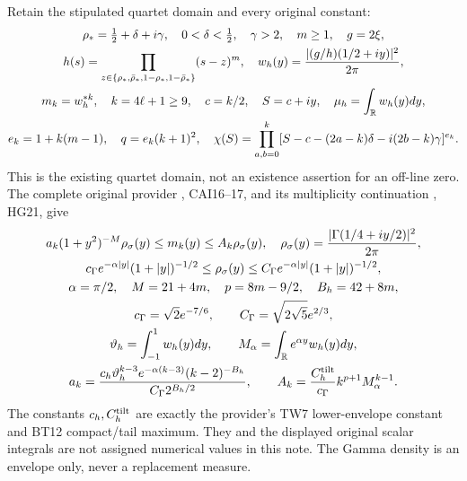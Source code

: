 Retain the stipulated quartet domain and every original constant:
\begin{equation}\label{mprec:eq:objects}
\begin{gathered}
 \rho_*=\tfrac12+\delta+i\gamma,\quad 0<\delta<\tfrac12,
 \quad\gamma>2,\quad m\ge1,\quad g=2\xi,\\
 h(s)=\prod_{z\in\{\rho_*,\bar\rho_*,1-\rho_*,1-\bar\rho_*\}}(s-z)^m,
 \quad w_h(y)=\frac{|(g/h)(1/2+iy)|^2}{2\pi},\\
 m_k=w_h^{*k},\quad k=4\ell+1\ge9,\quad
 c=k/2,\quad S=c+iy,\quad \mu_h=\int_\mathbb R w_h(y)dy,\\
 e_k=1+k(m-1),\quad q=e_k(k+1)^2,\quad
 \chi(S)=\prod_{a,b=0}^k
 [S-c-(2a-k)\delta-i(2b-k)\gamma]^{e_k}.
\end{gathered}
\end{equation}
This is the existing quartet domain, not an existence assertion for
an off-line zero. The complete original provider \cite{mprec:CAI},
CAI16--17, and its multiplicity continuation \cite{mprec:HG}, HG21, give
\begin{equation}\label{mprec:eq:envelope}
\begin{gathered}
 a_k(1+y^2)^{-M}\rho_\sigma(y)\le m_k(y)\le A_k\rho_\sigma(y),
 \quad \rho_\sigma(y)=\frac{|\Gamma(1/4+iy/2)|^2}{2\pi},\\
 c_\Gamma e^{-\alpha|y|}(1+|y|)^{-1/2}
 \le\rho_\sigma(y)\le
 C_\Gamma e^{-\alpha|y|}(1+|y|)^{-1/2},\\
 \alpha=\pi/2,\quad M=21+4m,\quad p=8m-9/2,\quad B_h=42+8m,\\
 c_\Gamma=\sqrt2e^{-7/6},\qquad C_\Gamma=\sqrt{2\sqrt5}e^{2/3},\\
 \vartheta_h=\int_{-1}^1w_h(y)dy,\qquad
 M_\alpha=\int_\mathbb R e^{\alpha y}w_h(y)dy,\\
 a_k=\frac{c_h\vartheta_h^{k-3}e^{-\alpha(k-3)}(k-2)^{-B_h}}
 {C_\Gamma2^{B_h/2}},\qquad
 A_k=\frac{C_h^{\rm tilt}}{c_\Gamma}k^{p+1}M_\alpha^{k-1}.
\end{gathered}
\end{equation}
The constants $c_h,C_h^{\rm tilt}$ are exactly the provider's TW7
lower-envelope constant and BT12 compact/tail maximum. They and the
displayed original scalar integrals are not assigned numerical values
in this note. The Gamma density is an envelope only, never a
replacement measure.

